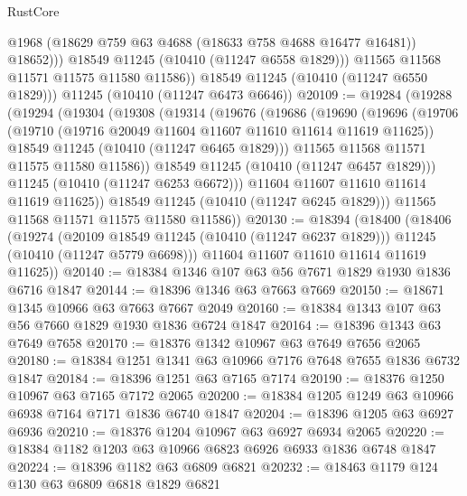 \begin{lexlean}{RustCore}
\begin{coremodule}
                  @1968
                  (@18629 @759 @63 @4688 (@18633 @758 @4688 @16477 @16481))
                  @18652)))
            @18549
            @11245
            (@10410 (@11247 @6558 @1829)))
          @11565
          @11568
          @11571
          @11575
          @11580
          @11586))
      @18549
      @11245
      (@10410 (@11247 @6550 @1829)))
    @11245
    (@10410 (@11247 @6473 @6646))
@20109 := @19284
    (@19288
      (@19294
        (@19304
          (@19308
            (@19314
              (@19676
                (@19686
                  (@19690
                    (@19696
                      (@19706
                        (@19710 (@19716 @20049 @11604 @11607 @11610 @11614 @11619 @11625))
                        @18549
                        @11245
                        (@10410 (@11247 @6465 @1829)))
                      @11565
                      @11568
                      @11571
                      @11575
                      @11580
                      @11586))
                  @18549
                  @11245
                  (@10410 (@11247 @6457 @1829)))
                @11245
                (@10410 (@11247 @6253 @6672)))
              @11604
              @11607
              @11610
              @11614
              @11619
              @11625))
          @18549
          @11245
          (@10410 (@11247 @6245 @1829)))
        @11565
        @11568
        @11571
        @11575
        @11580
        @11586))
@20130 := @18394
    (@18400
      (@18406
        (@19274
          (@20109 @18549 @11245 (@10410 (@11247 @6237 @1829)))
          @11245
          (@10410 (@11247 @5779 @6698)))
        @11604
        @11607
        @11610
        @11614
        @11619
        @11625))
@20140 := @18384 @1346 @107 @63 @56 @7671 @1829 @1930 @1836 @6716 @1847
@20144 := @18396 @1346 @63 @7663 @7669
@20150 := @18671 @1345 @10966 @63 @7663 @7667 @2049
@20160 := @18384 @1343 @107 @63 @56 @7660 @1829 @1930 @1836 @6724 @1847
@20164 := @18396 @1343 @63 @7649 @7658
@20170 := @18376 @1342 @10967 @63 @7649 @7656 @2065
@20180 := @18384 @1251 @1341 @63 @10966 @7176 @7648 @7655 @1836 @6732 @1847
@20184 := @18396 @1251 @63 @7165 @7174
@20190 := @18376 @1250 @10967 @63 @7165 @7172 @2065
@20200 := @18384 @1205 @1249 @63 @10966 @6938 @7164 @7171 @1836 @6740 @1847
@20204 := @18396 @1205 @63 @6927 @6936
@20210 := @18376 @1204 @10967 @63 @6927 @6934 @2065
@20220 := @18384 @1182 @1203 @63 @10966 @6823 @6926 @6933 @1836 @6748 @1847
@20224 := @18396 @1182 @63 @6809 @6821
@20232 := @18463 @1179 @124 @130 @63 @6809 @6818 @1829 @6821

\end{coremodule}
\end{lexlean}
